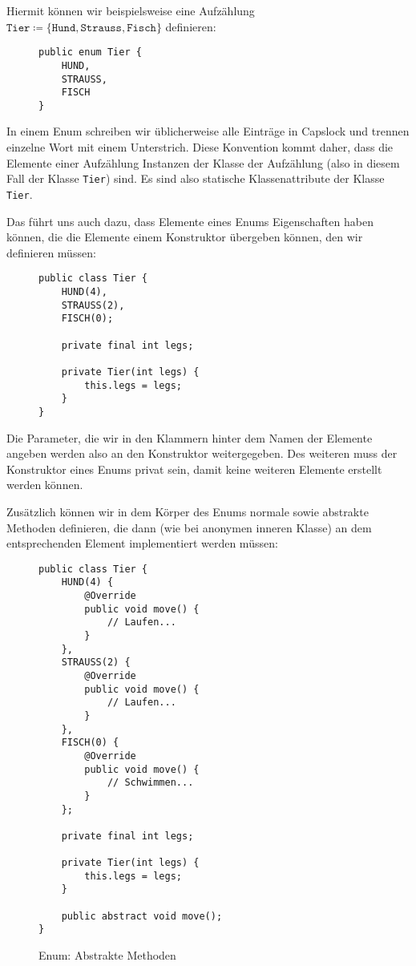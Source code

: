 	Hiermit können wir beispielsweise eine Aufzählung \( \texttt{Tier} \coloneqq \{ \texttt{Hund}, \texttt{Strauss}, \texttt{Fisch} \} \) definieren:
	\begin{figure}[H]
		\centering
		\begin{lstlisting}
public enum Tier {
	HUND,
	STRAUSS,
	FISCH
}
\end{lstlisting}
	\end{figure}
	In einem Enum schreiben wir üblicherweise alle Einträge in Capslock und trennen einzelne Wort mit einem Unterstrich. Diese Konvention kommt daher, dass die Elemente einer Aufzählung Instanzen der Klasse der Aufzählung (also in diesem Fall der Klasse \lstinline|Tier|) sind. Es sind also statische Klassenattribute der Klasse \lstinline|Tier|.
	
	Das führt uns auch dazu, dass Elemente eines Enums Eigenschaften haben können, die die Elemente einem Konstruktor übergeben können, den wir definieren müssen:
	\begin{figure}[H]
		\centering
		\begin{lstlisting}
public class Tier {
	HUND(4),
	STRAUSS(2),
	FISCH(0);

	private final int legs;

	private Tier(int legs) {
		this.legs = legs;
	}
}
\end{lstlisting}
	\end{figure}
	Die Parameter, die wir in den Klammern hinter dem Namen der Elemente angeben werden also an den Konstruktor weitergegeben. Des weiteren muss der Konstruktor eines Enums privat sein, damit keine weiteren Elemente erstellt werden können.
	
	Zusätzlich können wir in dem Körper des Enums normale sowie abstrakte Methoden definieren, die dann (wie bei anonymen inneren Klasse) an dem entsprechenden Element implementiert werden müssen:
	\begin{figure}[H]
		\centering
		\begin{lstlisting}
public class Tier {
	HUND(4) {
		@Override
		public void move() {
			// Laufen...
		}
	},
	STRAUSS(2) {
		@Override
		public void move() {
			// Laufen...
		}
	},
	FISCH(0) {
		@Override
		public void move() {
			// Schwimmen...
		}
	};

	private final int legs;

	private Tier(int legs) {
		this.legs = legs;
	}

	public abstract void move();
}
\end{lstlisting}
		\caption{Enum: Abstrakte Methoden}
		\label{fig:enum_abstract_method}
	\end{figure}

